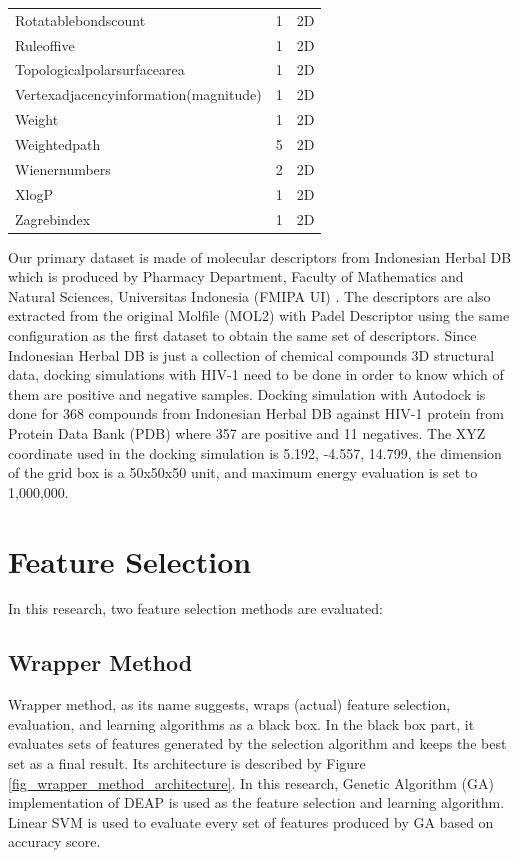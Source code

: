 \documentclass[conference]{IEEEtran}
\begin{document}
\begin{table}
\begin{tabular}{|l|c|c|}
		Rotatablebondscount & 	1  & 2D \\
		Ruleoffive & 	1  & 2D \\
		Topologicalpolarsurfacearea & 	1  & 2D \\
		Vertexadjacencyinformation(magnitude) & 	1  & 2D \\
		Weight & 	1  & 2D \\
		Weightedpath & 	5  & 2D \\
		Wienernumbers & 	2  & 2D \\
		XlogP & 	1  & 2D \\
		Zagrebindex & 	1  & 2D \\	
		\hline 
	\end{tabular} 
\end{table}	

Our primary dataset is made of molecular descriptors from Indonesian Herbal DB which is produced by Pharmacy Department, Faculty of Mathematics and Natural Sciences, Universitas Indonesia (FMIPA UI) \cite{yanuar2011medicinal}. The descriptors are also extracted from the original Molfile (MOL2) with Padel Descriptor using the same configuration as the first dataset to obtain the same set of descriptors. Since Indonesian Herbal DB is just a collection of chemical compounds 3D structural data, docking simulations with HIV-1 need to be done in order to know which of them are positive and negative samples. Docking simulation with Autodock is done for 368 compounds from Indonesian Herbal DB against HIV-1 protein from Protein Data Bank (PDB) where 357 are positive and 11 negatives. The XYZ coordinate used in the docking simulation is 5.192, -4.557, 14.799, the dimension of the grid box is a 50x50x50 unit, and maximum energy evaluation is set to 1,000,000.

\section{Feature Selection} \label{Feature Selection}

In this research, two feature selection methods are evaluated:

\subsection{Wrapper Method}

Wrapper method, as its name suggests, wraps (actual) feature selection, evaluation, and learning algorithms as a black box\cite{tang2014feature}. In the black box part, it evaluates sets of features generated by the selection algorithm and keeps the best set as a final result. Its architecture is described by Figure \ref{fig_wrapper_method_architecture}. In this research, Genetic Algorithm (GA) implementation of DEAP \cite{DEAP_JMLR2012} is used as the feature selection and learning algorithm. Linear SVM is used to evaluate every set of features produced by GA based on accuracy score.
\end{document}
